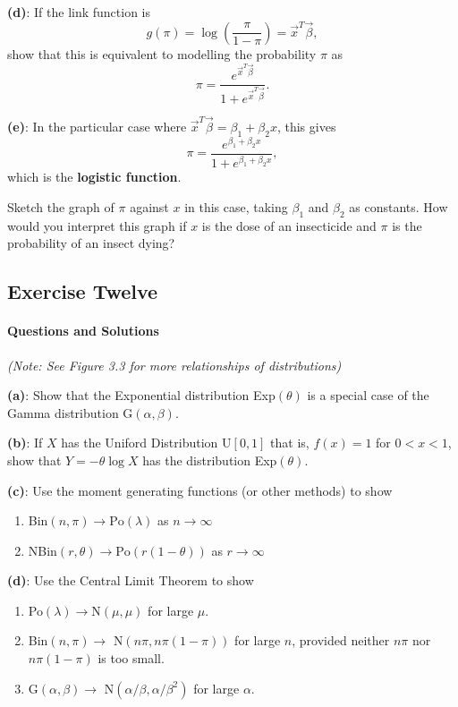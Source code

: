 \documentclass[]{article}
\providecommand{\tightlist}{%
  \setlength{\itemsep}{0pt}\setlength{\parskip}{0pt}}
\let\oldparagraph\paragraph
\renewcommand{\paragraph}[1]{\oldparagraph{#1}\mbox{}}
\begin{document}
\textbf{(d)}: If the link function is
\[g(\pi) = \log\left( \frac{\pi}{1-\pi} \right) = \vec{x}^T\vec{\beta},\]
show that this is equivalent to modelling the probability \(\pi\) as
\[\pi = \frac{e^{\vec{x}^T\vec{\beta}}}{1 + e^{\vec{x}^T\vec{\beta}}}.\]

\textbf{(e)}: In the particular case where
\(\vec{x}^T\vec{\beta} = \beta_1 + \beta_2x\), this gives
\[\pi = \frac{e^{\beta_1 + \beta_2x}}{1 + e^{\beta_1 + \beta_2x}},\]
which is the \textbf{logistic function}.

Sketch the graph of \(\pi\) against \(x\) in this case, taking
\(\beta_1\) and \(\beta_2\) as constants. How would you interpret this
graph if \(x\) is the dose of an insecticide and \(\pi\) is the
probability of an insect dying?

\subsection{Exercise Twelve}\label{exercise-twelve}

\paragraph{Questions and Solutions}\label{questions-and-solutions-1}

\emph{(Note: See Figure 3.3 for more relationships of distributions)}

\textbf{(a)}: Show that the Exponential distribution Exp\((\theta)\) is
a special case of the Gamma distribution G\((\alpha, \beta)\).

\textbf{(b)}: If \(X\) has the Uniford Distribution U\([0,1]\) that is,
\(f(x) = 1\) for \(0 < x < 1\), show that \(Y = -\theta \log X\) has the
distribution Exp\((\theta)\).

\textbf{(c)}: Use the moment generating functions (or other methods) to
show

\begin{enumerate}
\def\labelenumi{\roman{enumi}.}
\tightlist
\item
  Bin\((n, \pi) \rightarrow \text{Po}(\lambda)\) as
  \(n \rightarrow \infty\)
\item
  NBin\((r, \theta) \rightarrow \text{Po}(r(1 - \theta))\) as
  \(r \rightarrow \infty\)
\end{enumerate}

\textbf{(d)}: Use the Central Limit Theorem to show

\begin{enumerate}
\def\labelenumi{\roman{enumi}.}
\tightlist
\item
  Po\((\lambda) \rightarrow \text{N}(\mu, \mu)\) for large \(\mu\).
\item
  Bin\((n, \pi) \rightarrow\) N\((n\pi, n\pi(1 - \pi))\) for large
  \(n\), provided neither \(n\pi\) nor \(n\pi(1- \pi)\) is too small.
\item
  G\((\alpha, \beta) \rightarrow\) N\((\alpha/\beta, \alpha/\beta^2)\)
  for large \(\alpha\).
\end{enumerate}
\end{document}
